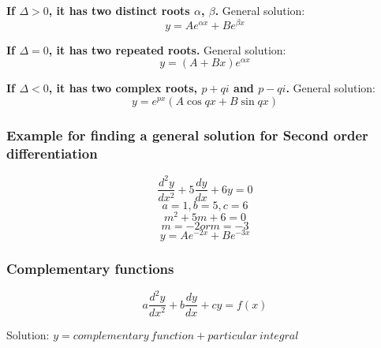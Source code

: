 \documentclass[a4paper,9pt]{scrartcl}
\begin{document}
    \textbf{If $\Delta > 0$, it has two distinct roots $\alpha$, $\beta$.}
    General solution:
    \begin{displaymath}
        y = Ae^{{\alpha}x} + Be^{{\beta}x}
    \end{displaymath}

    \textbf{If $\Delta = 0$, it has two repeated roots.}
    General solution:
    \begin{displaymath}
        y = (A+Bx)e^{{\alpha}x}
    \end{displaymath}

    \textbf{If $\Delta < 0$, it has two complex roots, $p + qi$ and $p - qi$. }
    General solution:
    \begin{displaymath}
        y = e^{px}(A\cos{qx}+B\sin{qx})
    \end{displaymath}

    \subsubsection{Example for finding a general solution for Second order differentiation}

    \begin{displaymath}
        \frac{d^{2}y}{dx^2} + 5\frac{dy}{dx} + 6y = 0
    \end{displaymath}
    \begin{displaymath}
        a = 1, b = 5, c = 6
    \end{displaymath}
    \begin{displaymath}
        m^2 + 5m + 6 = 0
    \end{displaymath}
    \begin{displaymath}
        m = -2 or m = -3
    \end{displaymath}
    \begin{displaymath}
        y = Ae^{-2x}+Be^{-3x}
    \end{displaymath}

    \subsubsection{Complementary functions}

    \begin{displaymath}
        a\frac{d^{2}y}{dx^2} + b\frac{dy}{dx} + cy = f(x)
    \end{displaymath}

    Solution: $y = complementary\ function + particular\ integral$ \\
\end{document}
